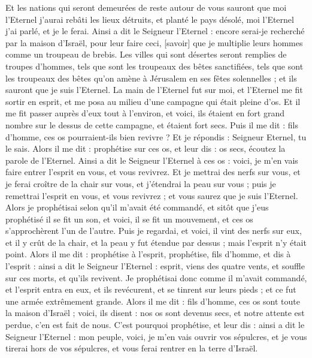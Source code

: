 \begin{multicols}{2}
Et les nations qui seront demeurées de reste autour de vous sauront que moi l'Eternel j'aurai rebâti les lieux détruits, et planté le pays désolé, moi l'Eternel j'ai parlé, et je le ferai.
Ainsi a dit le Seigneur l'Eternel : encore serai-je recherché par la maison d'Israël, pour leur faire ceci, [savoir] que je multiplie leurs hommes comme un troupeau de brebis.
Les villes qui sont désertes seront remplies de troupes d'hommes, tels que sont les troupeaux des bêtes sanctifiées, tels que sont les troupeaux des bêtes qu'on amène à Jérusalem en ses fêtes solennelles ; et ils sauront que je suis l'Eternel.
\VerseOne{}La main de l'Eternel fut sur moi, et l'Eternel me fit sortir en esprit, et me posa au milieu d'une campagne qui était pleine d'os.
Et il me fit passer auprès d'eux tout à l'environ, et voici, ils étaient en fort grand nombre sur le dessus de cette campagne, et étaient fort secs.
Puis il me dit : fils d'homme, ces os pourraient-ils bien revivre ? Et je répondis : Seigneur Eternel, tu le sais.
Alors il me dit : prophétise sur ces os, et leur dis : os secs, écoutez la parole de l'Eternel.
Ainsi a dit le Seigneur l'Eternel à ces os : voici, je m'en vais faire entrer l'esprit en vous, et vous revivrez.
Et je mettrai des nerfs sur vous, et je ferai croître de la chair sur vous, et j'étendrai la peau sur vous ; puis je remettrai l'esprit en vous, et vous revivrez ; et vous saurez que je suis l'Eternel.
Alors je prophétisai selon qu'il m'avait été commandé, et sitôt que j'eus prophétisé il se fit un son, et voici, il se fit un mouvement, et ces os s'approchèrent l'un de l'autre.
Puis je regardai, et voici, il vint des nerfs sur eux, et il y crût de la chair, et la peau y fut étendue par dessus ; mais l'esprit n'y était point.
Alors il me dit : prophétise à l'esprit, prophétise, fils d'homme, et dis à l'esprit : ainsi a dit le Seigneur l'Eternel : esprit, viens des quatre vents, et souffle sur ces morts, et qu'ils revivent.
Je prophétisai donc comme il m'avait commandé, et l'esprit entra en eux, et ils revécurent, et se tinrent sur leurs pieds ; et ce fut une armée extrêmement grande.
Alors il me dit : fils d'homme, ces os sont toute la maison d'Israël ; voici, ils disent : nos os sont devenus secs, et notre attente est perdue, c'en est fait de nous.
C'est pourquoi prophétise, et leur dis : ainsi a dit le Seigneur l'Eternel : mon peuple, voici, je m'en vais ouvrir vos sépulcres, et je vous tirerai hors de vos sépulcres, et vous ferai rentrer en la terre d'Israël.

\end{multicols}
